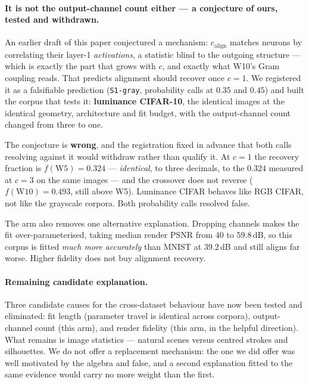 \documentclass[10pt,twocolumn,letterpaper]{article}
\theoremstyle{definition}
\newcommand{\calign}{c_{\mathrm{align}}}
\begin{document}
\paragraph{It is not the output-channel count either --- a conjecture of ours, tested and
withdrawn.} An earlier draft of this paper conjectured a mechanism: $\calign$ matches neurons by
correlating their layer-1 \emph{activations}, a statistic blind to the outgoing structure --- which
is exactly the part that grows with $c$, and exactly what W10's Gram coupling reads. That predicts
alignment should recover once $c=1$. We registered it as a falsifiable prediction
(\texttt{S1-gray}, probability calls at $0.35$ and $0.45$) and built the corpus that tests it:
\textbf{luminance CIFAR-10}, the identical images at the identical geometry, architecture and fit
budget, with the output-channel count changed from three to one.



The conjecture is \textbf{wrong}, and the registration fixed in advance that both calls resolving
against it would withdraw rather than qualify it. At $c=1$ the recovery fraction is $f(\mathrm{W5}) = 0.324$ ---
\emph{identical}, to three decimals, to the $0.324$ measured at $c=3$ on the same images --- and the
crossover does not reverse ($f(\mathrm{W10}) = 0.493$, still above W5). Luminance CIFAR behaves like
RGB CIFAR, not like the grayscale corpora. Both probability calls resolved false.

The arm also removes one alternative explanation. Dropping channels makes the fit
over-parameterised, taking median render PSNR from $40$ to $59.8$\,dB, so this corpus is fitted
\emph{much more accurately} than MNIST at $39.2$\,dB and still aligns far worse. Higher fidelity
does not buy alignment recovery.

\paragraph{Remaining candidate explanation.} Three candidate causes for the cross-dataset behaviour have now been
tested and eliminated: fit length (parameter travel is identical across corpora), output-channel
count (this arm), and render fidelity (this arm, in the helpful direction). What remains is image
statistics --- natural scenes versus centred strokes and silhouettes. We do not offer a replacement
mechanism: the one we did offer was well motivated by the algebra and false, and a second
explanation fitted to the same evidence would carry no more weight than the first.
\end{document}
